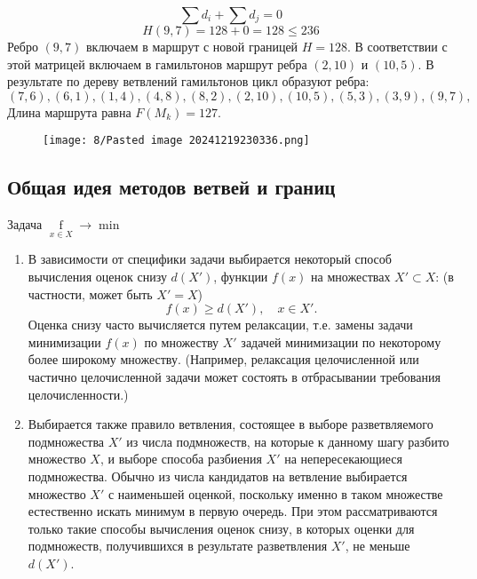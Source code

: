 \documentclass[17pt]{extarticle}
\begin{document}
\[ \sum d_i + \sum d_j = 0 \]
\[ H(9,7) = 128 + 0 = 128 \leq 236 \]
Ребро \((9,7)\) включаем в маршрут с новой границей \( H = 128 \).
В соответствии с этой матрицей включаем в гамильтонов маршрут ребра \((2,10)\) и \((10,5)\).
В результате по дереву ветвлений гамильтонов цикл образуют ребра:
\[ (7,6), (6,1), (1,4), (4,8), (8,2), (2,10), (10,5), (5,3), (3,9), (9,7), \]
Длина маршрута равна \( F(M_k) = 127 \).
\begin{figure}[H]
    \centering
    \texttt{[image: 8/Pasted image 20241219230336.png]}
\end{figure}

\clearpage



\subsection*{Общая идея методов ветвей и границ}
Задача \( \mathop{f(x)}\limits_{x \in X} \rightarrow \min \)
\begin{enumerate}
    \item В зависимости от специфики задачи выбирается некоторый способ вычисления оценок снизу $d(X')$, функции $f(x)$ на множествах $X' \subset X$: (в частности, может быть $X' = X$)
          \[
              f(x) \geq d(X'), \quad x \in X'.
          \]
          Оценка снизу часто вычисляется путем релаксации, т.е. замены задачи минимизации $f(x)$ по множеству $X'$ задачей минимизации по некоторому более широкому множеству.
          (Например, релаксация целочисленной или частично целочисленной задачи может состоять в отбрасывании требования целочисленности.)

    \item Выбирается также правило ветвления,
          состоящее в выборе разветвляемого подмножества $X'$ из числа подмножеств,
          на которые к данному шагу разбито множество $X$,
          и выборе способа разбиения $X'$ на непересекающиеся подмножества.
          Обычно из числа кандидатов на ветвление выбирается множество $X'$ с наименьшей оценкой, поскольку именно в таком множестве естественно искать минимум в первую очередь.
          При этом рассматриваются только такие способы вычисления оценок снизу, в которых оценки для подмножеств, получившихся в результате разветвления $X'$, не меньше $d(X')$.
\end{enumerate}
\end{document}
